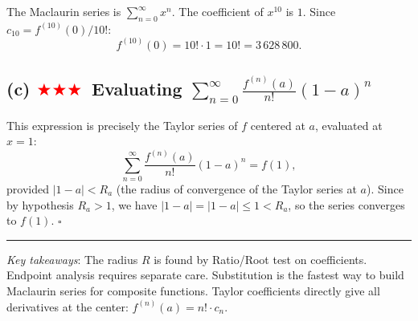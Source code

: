 \documentclass[12pt,a4paper]{article}
\newcommand{\hard}{\textcolor{red}{$\bigstar\bigstar\bigstar$}}
\begin{document}
The Maclaurin series is $\sum_{n=0}^{\infty}x^n$.  The coefficient of $x^{10}$ is $1$.
Since $c_{10} = f^{(10)}(0)/10!$:
\[
  f^{(10)}(0) = 10!\cdot 1 = \boxed{10!} = 3\,628\,800.
\]

\subsection*{(c) \hard\ Evaluating $\sum_{n=0}^{\infty}\frac{f^{(n)}(a)}{n!}(1-a)^n$}

This expression is precisely the Taylor series of $f$ centered at $a$, evaluated at $x=1$:
\[
  \sum_{n=0}^{\infty}\frac{f^{(n)}(a)}{n!}(1-a)^n = f(1),
\]
provided $|1-a| < R_a$ (the radius of convergence of the Taylor series at $a$).  Since by hypothesis $R_a > 1$, we have $|1-a|=|1-a|\leq 1 < R_a$, so the series converges to $f(1)$. $\square$

\bigskip
\hrule
\bigskip
\textit{Key takeaways}: The radius $R$ is found by Ratio/Root test on coefficients.  Endpoint analysis requires separate care.  Substitution is the fastest way to build Maclaurin series for composite functions.  Taylor coefficients directly give all derivatives at the center: $f^{(n)}(a)=n!\cdot c_n$.
\end{document}
